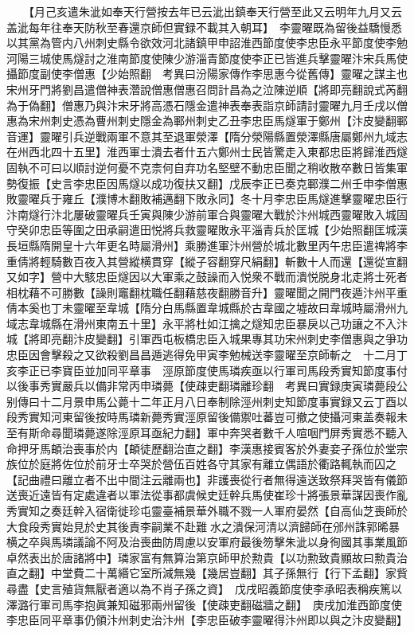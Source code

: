 　　【月己亥遣朱泚如奉天行營按去年已云泚出鎮奉天行營至此又云明年九月又云盖泚每年往奉天防秋至春還京師但實録不載其入朝耳】　李靈曜既為留後益驕慢悉以其黨為管内八州刺史縣令欲效河北諸鎮甲申詔淮西節度使李忠臣永平節度使李勉河陽三城使馬燧討之淮南節度使陳少游淄青節度使李正已皆進兵擊靈曜汴宋兵馬使攝節度副使李僧惠【少始照翻　考異曰汾陽家傳作李思惠今從舊傳】靈曜之謀主也宋州牙門將劉昌遣僧神表濳說僧惠僧惠召問計昌為之泣陳逆順【將即亮翻說式芮翻為于偽翻】僧惠乃與汴宋牙將高憑石隱金遣神表奉表詣京師請討靈曜九月壬戌以僧惠為宋州刺史憑為曹州刺史隱金為鄆州刺史乙丑李忠臣馬燧軍于鄭州【汴皮變翻鄆音運】靈曜引兵逆戰兩軍不意其至退軍滎澤【隋分滎陽縣置滎澤縣唐屬鄭州九域志在州西北四十五里】淮西軍士潰去者什五六鄭州士民皆驚走入東都忠臣將歸淮西燧固執不可曰以順討逆何憂不克柰何自弃功名堅壁不動忠臣聞之稍收散卒數日皆集軍勢復振【史言李忠臣因馬燧以成功復扶又翻】戊辰李正已奏克鄆濮二州壬申李僧惠敗靈曜兵于雍丘【濮博木翻敗補邁翻下敗永同】冬十月李忠臣馬燧進擊靈曜忠臣行汴南燧行汴北屢破靈曜兵壬寅與陳少游前軍合與靈曜大戰於汴州城西靈曜敗入城固守癸卯忠臣等圍之田承嗣遣田悦將兵救靈曜敗永平淄青兵於匡城【少始照翻匡城漢長垣縣隋開皇十六年更名時屬滑州】乘勝進軍汴州營於城北數里丙午忠臣遣禆將李重倩將輕騎數百夜入其營縱横貫穿【縱子容翻穿尺絹翻】斬數十人而還【還從宣翻又如字】營中大駭忠臣燧因以大軍乘之鼓譟而入悦衆不戰而潰悦脱身北走將士死者相枕藉不可勝數【譟則竈翻枕職任翻藉慈夜翻勝音升】靈曜聞之開門夜遁汴州平重倩本奚也丁未靈曜至韋城【隋分白馬縣置韋城縣於古韋國之墟故曰韋城時屬滑州九域志韋城縣在滑州東南五十里】永平將杜如江擒之燧知忠臣暴戾以己功讓之不入汴城【將即亮翻汴皮變翻】引軍西屯板橋忠臣入城果專其功宋州刺史李僧惠與之爭功忠臣因會擊殺之又欲殺劉昌昌遁逃得免甲寅李勉械送李靈曜至京師斬之　十二月丁亥李正已李寶臣並加同平章事　涇原節度使馬璘疾亟以行軍司馬段秀實知節度事付以後事秀實嚴兵以備非常丙申璘薨【使疎吏翻璘離珍翻　考異曰實録庚寅璘薨段公别傳曰十二月景申馬公薨十二年正月八日奉制除涇州刺史知節度事實録又云丁酉以段秀實知河東留後按時馬璘新薨秀實涇原留後備禦吐蕃豈可撤之使攝河東盖奏報未至有斯命尋聞璘薨遂除涇原耳亟紀力翻】軍中奔哭者數千人喧咽門屏秀實悉不聽入命押牙馬頔治喪事於内【頔徒歷翻治直之翻】李漢惠接賓客於外妻妾子孫位於堂宗族位於庭將佐位於前牙士卒哭於營伍百姓各守其家有離立偶語於衢路輒執而囚之【記曲禮曰離立者不出中間注云離兩也】非護喪從行者無得遠送致祭拜哭皆有儀節送喪近遠皆有定處違者以軍法從事都虞候史廷幹兵馬使崔珍十將張景華謀因喪作亂秀實知之奏廷幹入宿衛徙珍屯靈臺補景華外職不戮一人軍府晏然【自高仙芝喪師於大食段秀實始見於史其後責李嗣業不赴難水之潰保河清以濟歸師在邠州誅郭晞暴横之卒與馬璘議論不阿及治喪曲防周慮以安軍府最後笏擊朱泚以身徇國其事業風節卓然表出於唐諸將中】璘家富有無算治第京師甲於勲貴【以功勲致貴顯故曰勲貴治直之翻】中堂費二十萬緡它室所減無幾【幾居豈翻】其子孫無行【行下孟翻】家貲尋盡【史言殖貨無厭者適以為不肖子孫之資】　戊戌昭義節度使李承昭表稱疾篤以澤潞行軍司馬李抱眞兼知磁邪兩州留後【使疎吏翻磁牆之翻】　庚戌加淮西節度使李忠臣同平章事仍領汴州刺史治汴州【李忠臣破李靈曜得汴州即以與之汴皮變翻】

